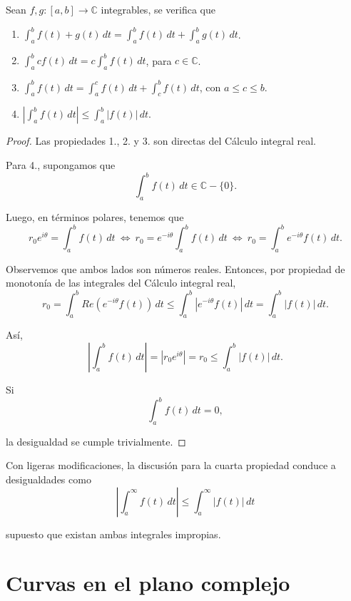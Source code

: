 \begin{propo}
Sean $f, g: [a,b] \longrightarrow \mathbb{C}$ integrables, se verifica que 

\begin{enumerate}

\item $\int_a^b f(t) + g(t) \,dt = \int_a^b f(t) \,dt + \int_a^b g(t) \,dt$.

\item $\int_a^b c f(t) \,dt = c \int_a^b f(t) \,dt$, para $c \in \mathbb{C}$.

\item $\int_a^b f(t) \,dt = \int_a^c f(t) \,dt + \int_c^b f(t) \,dt$, con $a \leq c \leq b$.

\item $\left| \int_a^b f(t) \,dt \right| \leq \int_a^b |f(t)| \,dt$.
\end{enumerate}
\end{propo}

\begin{proof}
Las propiedades 1., 2. y 3. son directas del Cálculo integral real.

Para 4., supongamos que 
$$\int_a^b f(t) \,dt \in \mathbb{C}-\{0\}.$$

Luego, en términos polares, tenemos que
$$r_0 e^{i\theta} = \int_a^b f(t) \,dt ~\Leftrightarrow~ r_0 = e^{-i\theta} \int_a^b f(t) \,dt ~\Leftrightarrow~ r_0 = \int_a^b e^{-i\theta} f(t) \,dt. $$

Observemos que ambos lados son números reales. Entonces, por propiedad de monotonía de las integrales del Cálculo integral real,
$$r_0 = \int_a^b Re \left( e^{-i\theta} f(t)\right) \,dt \leq \int_a^b  \left|e^{-i\theta} f(t) \right| \,dt = \int_a^b |f(t)| \,dt.$$

Así, 
$$\left|\int_a^b f(t) \,dt \right| = |r_0 e^{i\theta}| = r_0 \leq \int_a^b |f(t)|\,dt.$$

Si 
$$\int_a^b f(t) \,dt = 0,$$

la desigualdad se cumple trivialmente.

\end{proof}

Con ligeras modificaciones, la discusión para la cuarta propiedad conduce a desigualdades como
$$\left|\int_a^{\infty} f(t) \,dt \right| \leq \int_a^{\infty} |f(t)| \,dt$$

supuesto que existan ambas integrales impropias.

\section{Curvas en el plano complejo}

